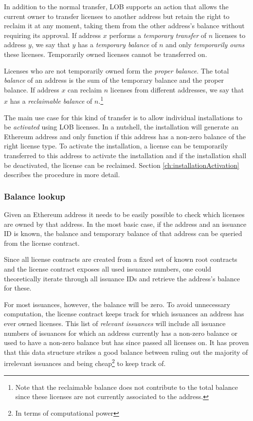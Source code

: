 \documentclass[a4paper]{article}
\begin{document}
In addition to the normal transfer, LOB supports an action that allows the current owner to transfer licenses to another address but retain the right to reclaim it at any moment, taking them from the other address's balance without requiring its approval. If address $x$ performs a \emph{temporary transfer} of $n$ licenses to address $y$, we say that $y$ has a \emph{temporary balance} of $n$ and only \emph{temporarily owns} these licenses. Temporarily owned licenses cannot be transferred on.

Licenses who are not temporarily owned form the \emph{proper balance}. The total \emph{balance} of an address is the sum of the temporary balance and the proper balance. If address $x$ can reclaim $n$ licenses from different addresses, we say that $x$ has a \emph{reclaimable balance} of $n$.\footnote{Note that the reclaimable balance does not contribute to the total balance since these licenses are not currently associated to the address.}

The main use case for this kind of transfer is to allow individual installations to be \emph{activated} using LOB licenses. In a nutshell, the installation will generate an Ethereum address and only function if this address has a non-zero balance of the right license type. To activate the installation, a license can be temporarily transferred to this address to activate the installation and if the installation shall be deactivated, the license can be reclaimed. Section \ref{ch:installationActivation} describes the procedure in more detail.





\subsubsection{Balance lookup}
\label{ch:licenseContractBalanceLookup}

Given an Ethereum address it needs to be easily possible to check which licenses are owned by that address. In the most basic case, if the address and an issuance ID is known, the balance and temporary balance of that address can be queried from the license contract. 

Since all license contracts are created from a fixed set of known root contracts and the license contract exposes all used issuance numbers, one could theoretically iterate through all issuance IDs and retrieve the address's balance for these.

For most issuances, however, the balance will be zero. To avoid unnecessary computation, the license contract keeps track for which issuances an address has ever owned licenses. This list of \emph{relevant issuances} will include all issuance numbers of issuances for which an address currently has a non-zero balance or used to have a non-zero balance but has since passed all licenses on. It has proven that this data structure strikes a good balance between ruling out the majority of irrelevant issuances and being cheap\footnote{In terms of computational power} to keep track of.
\end{document}
